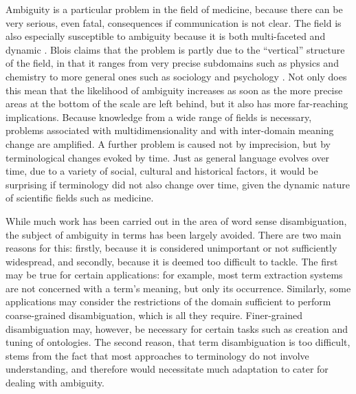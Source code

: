 Ambiguity is a particular problem in the field of medicine, because
there can be very serious, even fatal, consequences if communication
is not clear. The field is also especially susceptible to ambiguity because it is both
multi-faceted and dynamic \cite{Sager90}. Blois claims
that the problem is partly due to the ``vertical'' structure of the
field, in that it ranges from very precise subdomains such as
physics and chemistry to more general ones such as sociology and
psychology \cite{Blois88}. Not only does this mean that the likelihood of ambiguity
increases as soon as the more precise areas at the bottom of the scale
are left behind, but it also has more far-reaching
implications. Because knowledge from a wide range of fields is
necessary, problems associated with multidimensionality and with
inter-domain meaning change are amplified. A further problem is caused
not by imprecision, but by terminological changes evoked by time. Just
as general language evolves over time, due to a variety of social,
cultural and historical factors, it would be surprising if terminology
did not also change over time, given the dynamic nature of scientific
fields such as medicine.

While much work has been carried out in the area of word sense
disambiguation, the subject of ambiguity in terms has been largely
avoided. There are two main reasons for this: firstly, because it is
considered unimportant or not sufficiently widespread, and secondly,
because it is deemed too difficult to tackle. The first may be true
for certain applications: for example, most term extraction systems are not concerned with a
term's meaning, but only its occurrence. Similarly, some applications
may consider the restrictions of the domain sufficient to perform
coarse-grained disambiguation, which is all they
require. Finer-grained disambiguation may, however, be necessary for
certain tasks such as creation and tuning of ontologies. The second
reason, that term disambiguation is too difficult, stems from the fact
that most approaches to terminology do not involve understanding, and
therefore would necessitate much adaptation to cater for dealing with
ambiguity.

